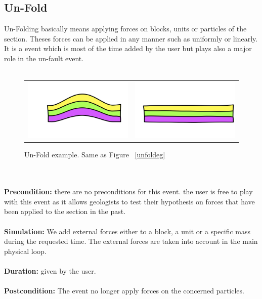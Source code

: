 \documentclass[12pt, a4paper]{report} %
\begin{document}
\subsection{Un-Fold}
\label{sub:unfold}
Un-Folding basically means applying forces on blocks, units or particles of the section. Theses forces can be applied in any manner such as uniformly or linearly. It is a event which is most of the time added by the user but plays also a major role in the un-fault event.\\\\
\begin{figure}[H]
\centering
\begin{tabular}{@{}cc@{}}
\includegraphics[width=.35\textwidth]{unFoldDescription0.png}&
\includegraphics[width=.35\textwidth]{unFoldDescription1.png}\\
\end{tabular}
\caption{Un-Fold example. Same as Figure ~\ref{unfoldeg}}
\label{unfoldeg2}
\end{figure}\\\\
\textbf{Precondition:} there are no preconditions for this event. the user is free to play with this event as it allows geologists to test their hypothesis on forces that have been applied to the section in the past.\\\\
\textbf{Simulation:} We add external forces either to a block, a unit or a specific mass during the requested time. The external forces are taken into account in the main physical loop.\\\\
\textbf{Duration:} given by the user.\\\\
\textbf{Postcondition:} The event no longer apply forces on the concerned particles.\\\\
\end{document}

